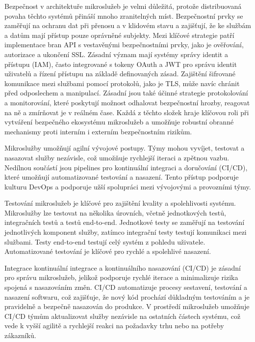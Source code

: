 
Bezpečnost v architektuře mikroslužeb je velmi důležitá, protože distribuovaná povaha těchto systémů přináší mnoho zranitelných míst. Bezpečnostní prvky se zaměřují na ochranu dat při přenosu a v klidovém stavu a zajišťují, že ke službám a datům mají přístup pouze oprávněné subjekty. Mezi klíčové strategie patří implementace bran API s vestavěnými bezpečnostními prvky, jako je ověřování, autorizace a ukončení SSL. Zásadní význam mají systémy správy identit a přístupu (IAM), často integrované s tokeny OAuth a JWT pro správu identit uživatelů a řízení přístupu na základě definovaných zásad. Zajištění šifrované komunikace mezi službami pomocí protokolů, jako je TLS, může navíc chránit před odposlechem a manipulací. Zásadní jsou také účinné strategie protokolování a monitorování, které poskytují možnost odhalovat bezpečnostní hrozby, reagovat na ně a zmírňovat je v reálném čase. Každá z těchto složek hraje klíčovou roli při vytváření bezpečného ekosystému mikroslužeb a umožňuje robustní obranné mechanismy proti interním i externím bezpečnostním rizikům.


Mikroslužby umožňují agilní vývojové postupy. Týmy mohou vyvíjet, testovat a nasazovat služby nezávisle, což umožňuje rychlejší iteraci a zpětnou vazbu. Nedílnou součástí jsou pipelines pro kontinuální integraci a doručování (CI/CD), které umožňují automatizované testování a nasazení. Tento přístup podporuje kulturu DevOps a podporuje užší spolupráci mezi vývojovými a provozními týmy.

Testování mikroslužeb je klíčové pro zajištění kvality a spolehlivosti systému. Mikroslužby lze testovat na několika úrovních, včetně jednotkových testů, integračních testů a testů end-to-end. Jednotkové testy se zaměřují na testování jednotlivých komponent služby, zatímco integrační testy testují komunikaci mezi službami. Testy end-to-end testují celý systém z pohledu uživatele. Automatizované testování je klíčové pro rychlé a spolehlivé nasazení.

Integrace kontinuální integrace a kontinuálního nasazování (CI/CD) je zásadní pro správu mikroslužeb, jelikož podporuje rychlé iterace a minimalizuje rizika spojená s nasazováním změn. CI/CD automatizuje procesy sestavení, testování a nasazení softwaru, což zajišťuje, že nový kód prochází důkladným testováním a je pravidelně a bezpečně nasazován do produkce. V prostředí mikroslužeb umožňuje CI/CD týmům aktualizovat služby nezávisle na ostatních částech systému, což vede k vyšší agilitě a rychlejší reakci na požadavky trhu nebo na potřeby zákazníků.

